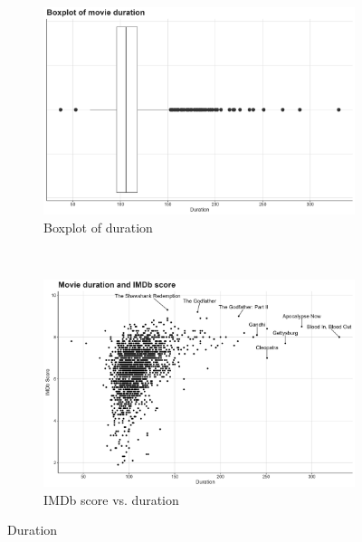 \documentclass[12pt,a4paper]{article}
\begin{document}
\begin{appendices}
    \begin{figure}[h]

        \begin{subfigure}[t]{0.5\textwidth}
            \includegraphics[width=0.95\linewidth]{duration.png}
            \caption{Boxplot of duration}
            \label{fig:duration-boxplot}
        \end{subfigure}
        ~
        \begin{subfigure}[t]{0.5\textwidth}
            \includegraphics[width=0.95\linewidth]{duration_imdb_score.png}
            \caption{IMDb score vs. duration}
            \label{fig:duration-scatter}
        \end{subfigure}

        \caption{Duration}
        \label{fig:duration}
    \end{figure}


\end{appendices}
\end{document}
